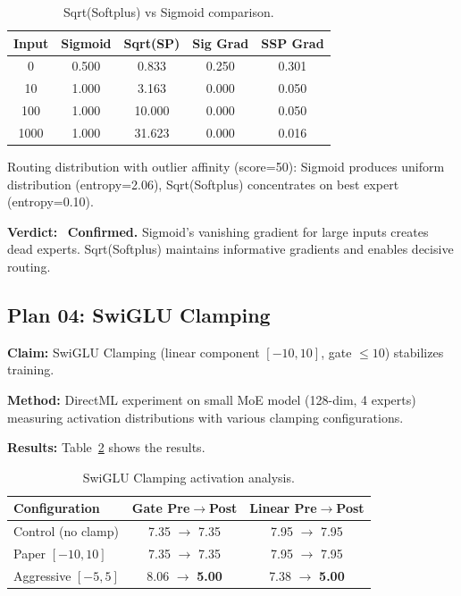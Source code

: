 \documentclass[11pt,a4paper]{article}
\begin{document}
\begin{table}[H]
\centering
\caption{Sqrt(Softplus) vs Sigmoid comparison.}
\label{tab:softplus-results}
\begin{tabular}{ccccc}
\toprule
\textbf{Input} & \textbf{Sigmoid} & \textbf{Sqrt(SP)} & \textbf{Sig Grad} & \textbf{SSP Grad} \\
\midrule
0 & 0.500 & 0.833 & 0.250 & 0.301 \\
10 & 1.000 & 3.163 & 0.000 & 0.050 \\
100 & 1.000 & 10.000 & 0.000 & 0.050 \\
1000 & 1.000 & 31.623 & 0.000 & 0.016 \\
\bottomrule
\end{tabular}
\end{table}

Routing distribution with outlier affinity (score=50): Sigmoid produces uniform distribution (entropy=2.06), Sqrt(Softplus) concentrates on best expert (entropy=0.10).

\textbf{Verdict:} \checkmark\ \textbf{Confirmed.} Sigmoid's vanishing gradient for large inputs creates dead experts. Sqrt(Softplus) maintains informative gradients and enables decisive routing.

\subsection{Plan 04: SwiGLU Clamping}

\textbf{Claim:} SwiGLU Clamping (linear component $[-10,10]$, gate $\leq 10$) stabilizes training.

\textbf{Method:} DirectML experiment on small MoE model (128-dim, 4 experts) measuring activation distributions with various clamping configurations.

\textbf{Results:} Table~\ref{tab:swiglu-results} shows the results.

\begin{table}[H]
\centering
\caption{SwiGLU Clamping activation analysis.}
\label{tab:swiglu-results}
\begin{tabular}{lcc}
\toprule
\textbf{Configuration} & \textbf{Gate Pre$\to$Post} & \textbf{Linear Pre$\to$Post} \\
\midrule
Control (no clamp) & 7.35 $\to$ 7.35 & 7.95 $\to$ 7.95 \\
Paper $[-10,10]$ & 7.35 $\to$ 7.35 & 7.95 $\to$ 7.95 \\
Aggressive $[-5,5]$ & 8.06 $\to$ \textbf{5.00} & 7.38 $\to$ \textbf{5.00} \\
\bottomrule
\end{tabular}
\end{table}
\end{document}

